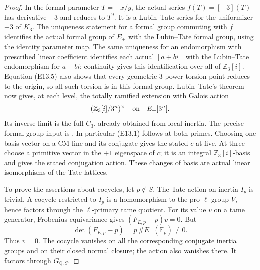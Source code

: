 \begin{proof}
In the formal parameter $T=-x/y$, the actual series
$f(T)=[-3](T)$ has derivative $-3$ and reduces to $T^9$.
It is a Lubin--Tate series for the uniformizer $-3$ of $K_3$.
The uniqueness statement for a formal group commuting with
$f$ identifies the actual formal group of $E_+$ with the
Lubin--Tate formal group, using the identity parameter map.
The same uniqueness for an endomorphism with prescribed linear
coefficient identifies each actual $[a+bi]$ with the
Lubin--Tate endomorphism for $a+bi$; continuity gives this
identification over all of $\mathbb Z_3[i]$.
Equation (E13.5) also shows that every geometric $3$-power
torsion point reduces to the origin, so all such torsion is in
this formal group.  Lubin--Tate's theorem now gives, at each
level, the totally ramified extension with Galois action
\[
      (\mathbb Z_3[i]/3^n)^\times
             \quad\hbox{on}\quad E_+[3^n].
\]
Its inverse limit is the full $C_3$, already obtained from local
inertia.  The precise formal-group input is
\cite[Lemma 1, Theorem 1, and Theorem 2(b),(d),(e)]{E_density_LT}.
In particular (E13.1) follows at both primes.  Choosing one basis
vector on a CM line and its conjugate gives the stated $c$ at
five.  At three choose a primitive vector in the $+1$ eigenspace
of $c$; it is an integral $\mathbb Z_3[i]$-basis and gives the
stated conjugation action.  These changes of basis are actual
linear isomorphisms of the Tate lattices.

To prove the assertions about cocycles, let $p\notin S$.
The Tate action on inertia $I_p$ is trivial.  A cocycle restricted
to $I_p$ is a homomorphism to the pro-$\ell$ group $V$, hence
factors through the $\ell$-primary tame quotient.
For its value $v$ on a tame generator, Frobenius equivariance
gives $(F_{E,p}-p)v=0$.  But
\[
    \det(F_{E,p}-p)=p\,\#E_+(\mathbb F_p)\ne0.
\]
Thus $v=0$.  The cocycle vanishes on all the corresponding
conjugate inertia groups and on their closed normal closure;
the action also vanishes there.  It factors through $G_{\mathbb Q,S}$.


\end{proof}
